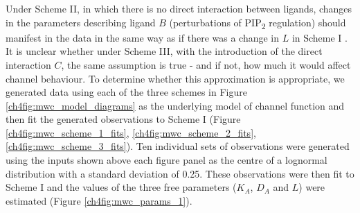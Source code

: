 Under Scheme II, in which there is no direct interaction between ligands, changes in the parameters describing ligand $B$ (perturbations of PIP\textsubscript{2} regulation) should manifest in the data in the same way as if there was a change in $L$ in Scheme I \cite{rubin_nature_1966}.
It is unclear whether under Scheme III, with the introduction of the direct interaction $C$, the same assumption is true - and if not, how much it would affect channel behaviour.
To determine whether this approximation is appropriate, we generated data using each of the three schemes in Figure \ref{ch4fig:mwc_model_diagrams} as the underlying model of channel function and then fit the generated observations to Scheme I (Figure \ref{ch4fig:mwc_scheme_1_fits}, \ref{ch4fig:mwc_scheme_2_fits}, \ref{ch4fig:mwc_scheme_3_fits}).
Ten individual sets of observations were generated using the inputs shown above each figure panel as the centre of a lognormal distribution with a standard deviation of 0.25.
These observations were then fit to Scheme I and the values of the three free parameters ($K_A$, $D_A$ and $L$) were estimated (Figure \ref{ch4fig:mwc_params_1}).

